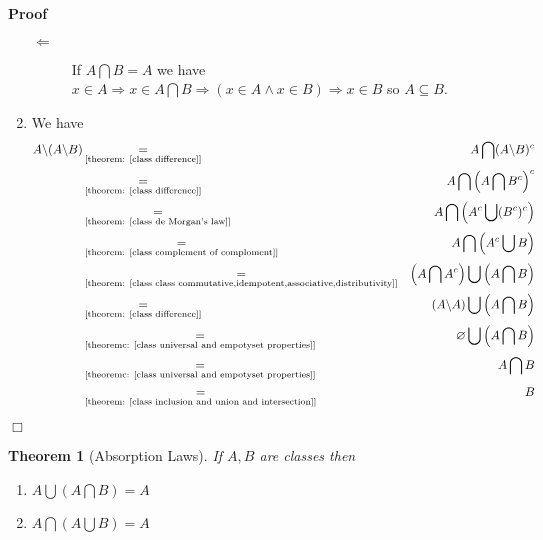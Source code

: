 \documentclass{book}
\newcommand{\equallim}{\mathop{=}\limits}
\newenvironment{proof}{\noindent\textbf{Proof\ }}{\hspace*{\fill}$\Box$\medskip}
\newtheorem{theorem}{Theorem}
\begin{document}
\begin{proof}
\begin{enumerate}
\begin{description}
      \item[$\Leftarrow$] If $A \bigcap B = A$ we have $x \in A \Rightarrow x
      \in A \bigcap B \Rightarrow (x \in A \wedge x \in B) \Rightarrow x \in
      B$ so $A \subseteq B$.
    \end{description}
    \item We have
    \begin{eqnarray*}
      A\backslash (A\backslash B) & \equallim_{\text{[theorem: \ref{class
      difference}]}} & A \bigcap (A\backslash B)^c\\
      & \equallim_{\text{[theorem: \ref{class difference}]}} & A \bigcap
      \left( A \bigcap B^c \right)^c\\
      & \equallim_{\text{[theorem: \ref{class de Morgan's law}]}} & A \bigcap
      \left( A^c \bigcup (B^c)^c \right)\\
      & \equallim_{\text{[theorem: \ref{class complement of comploment}]}} &
      A \bigcap \left( A^c \bigcup B \right)\\
      & \equallim_{\text{[theorem: \ref{class class
      commutative,idempotent,associative,distributivity}]}} & \left( A \bigcap
      A^c \right) \bigcup \left( A \bigcap B \right)\\
      & \equallim_{\text{[theorem: \ref{class difference}]}} & (A\backslash
      A) \bigcup \left( A \bigcap B \right)\\
      & \equallim_{\text{[theoremc: \ref{class universal and empotyset
      properties}]}} & \varnothing \bigcup \left( A \bigcap B \right)\\
      & \equallim_{\text{[theoremc: \ref{class universal and empotyset
      properties}]}} & A \bigcap B\\
      & \equallim_{\text{[theorem: \ref{class inclusion and union and
      intersection}]}} & B
    \end{eqnarray*}
  \end{enumerate}
  
\end{proof}

\begin{theorem}[Absorption Laws]
  \label{class absorption laws}If $A, B$ are classes then
  \begin{enumerate}
    \item $A \bigcup \left( A \bigcap B \right) = A$
    
    \item $A \bigcap \left( A \bigcup B \right) = A$
  \end{enumerate}
\end{theorem}
\end{document}

